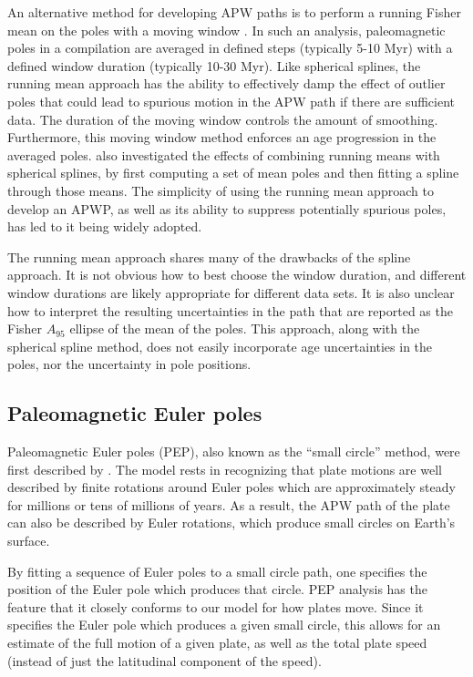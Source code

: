 \documentclass[11pt,letterpaper]{article}
\begin{document}
An alternative method for developing APW paths is to perform a running Fisher
mean on the poles with a moving window \citep{Irving1977a, Van-der-Voo2001a, Torsvik2008a}. In such an analysis, paleomagnetic poles in a compilation are averaged in defined steps (typically 5-10 Myr) with a defined window duration (typically 10-30 Myr). Like spherical splines, the running mean approach has the ability to effectively damp the effect of outlier poles that could lead to spurious motion in the APW path if there are sufficient data. The duration of the moving window controls the amount of smoothing. Furthermore, this moving window method enforces an age progression in the averaged poles. \citet{Torsvik2008a} also investigated the effects of combining running means with spherical splines, by first computing a set of mean poles and then fitting a spline through those means. 
The simplicity of using the running mean approach to develop an APWP, as well as its ability to suppress potentially spurious poles, has led to it being widely adopted.

The running mean approach shares many of the drawbacks of the spline approach.  It is not obvious how to best choose the window duration, and different window durations are likely appropriate for different data sets.  It is also unclear how to interpret the resulting uncertainties in the path that are reported as the Fisher $A_{95}$ ellipse of the mean of the poles. This approach, along with the spherical spline method, does not easily incorporate age uncertainties in the poles, nor the uncertainty in pole positions.

\subsection{Paleomagnetic Euler poles}
Paleomagnetic Euler poles (PEP), also known as the ``small circle'' method, were first described by \citet{gordon1984paleomagnetic}.
The model rests in recognizing that plate motions are well described by finite
rotations around Euler poles which are approximately steady for millions or 
tens of millions of years. As a result, the APW path of the plate
can also be described by Euler rotations, which
produce small circles on Earth's surface.

By fitting a sequence of Euler poles to a small circle path, one specifies
the position of the Euler pole which produces that circle.
PEP analysis has the feature that it closely conforms to our model for how plates move.
Since it specifies the Euler pole which produces a given small circle,
this allows for an estimate of the full motion of a given plate, 
as well as the total plate speed (instead of just the latitudinal component of the speed).
\end{document}
